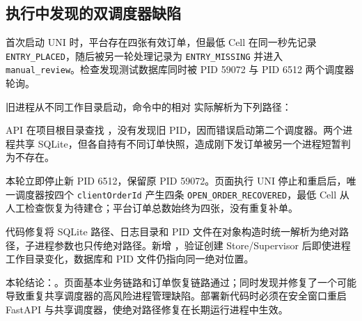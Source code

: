 \subsection{执行中发现的双调度器缺陷}

首次启动 UNI 时，平台存在四张有效订单，但最低 Cell 在同一秒先记录 \texttt{ENTRY\_PLACED}，随后被另一轮处理记录为 \texttt{ENTRY\_MISSING} 并进入 \texttt{manual\_review}。检查发现测试数据库同时被 PID 59072 与 PID 6512 两个调度器轮询。

旧进程从不同工作目录启动，命令中的相对  实际解析为下列路径：

\begin{quote}
  \small{}
\end{quote}

API 在项目根目录查找 ，没有发现旧 PID，因而错误启动第二个调度器。两个进程共享 SQLite，但各自持有不同订单快照，造成刚下发订单被另一个进程短暂判为不存在。

本轮立即停止新 PID 6512，保留原 PID 59072。页面执行 UNI 停止和重启后，唯一调度器按四个 \texttt{clientOrderId} 产生四条 \texttt{OPEN\_ORDER\_RECOVERED}，最低 Cell 从人工检查恢复为待建仓；平台订单总数始终为四张，没有重复补单。

代码修复将 SQLite 路径、日志目录和 PID 文件在对象构造时统一解析为绝对路径，子进程参数也只传绝对路径。新增 ，验证创建 Store/Supervisor 后即使进程工作目录变化，数据库和 PID 文件仍指向同一绝对位置。

本轮结论：\StatusPass。页面基本业务链路和订单恢复链路通过；同时发现并修复了一个可能导致重复共享调度器的高风险进程管理缺陷。部署新代码时必须在安全窗口重启 FastAPI 与共享调度器，使绝对路径修复在长期运行进程中生效。
